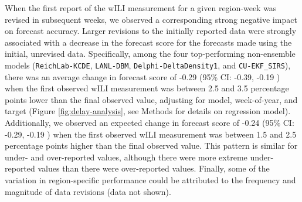 \documentclass{article}\usepackage[]{graphicx}\usepackage[]{color}
\begin{document}
When the first report of the wILI measurement for a given region-week was revised in subsequent weeks, we observed a corresponding strong negative impact on forecast accuracy.
Larger revisions to the initially reported data were strongly associated with a decrease in the forecast score for the forecasts made using the initial, unrevised data.
Specifically, among the four top-performing non-ensemble models ({\tt ReichLab-KCDE}, {\tt LANL-DBM}, {\tt Delphi-DeltaDensity1}, and {\tt CU-EKF\_SIRS}), there was an average change in forecast score of -0.29 
(95\% CI: 
-0.39,
-0.19
)
when the first observed wILI measurement was between 2.5 and 3.5 percentage points lower than the final observed value, adjusting for model, week-of-year, and target (Figure \ref{fig:delay-analysis}, see Methods for details on regression model).
Additionally, we observed an expected change in forecast score of 
-0.24 
(95\% CI: 
-0.29,
-0.19
)
when the first observed wILI measurement was between 1.5 and 2.5 percentage points higher than the final observed value.
This pattern is similar for under- and over-reported values, although there were more extreme under-reported values than there were over-reported values. 
Finally, some of the variation in region-specific performance could be attributed to the frequency and magnitude of data revisions (data not shown).


\end{document}
